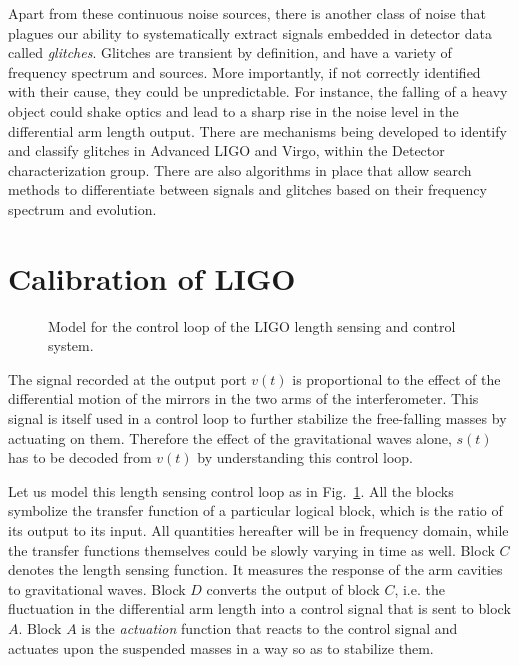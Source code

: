 Apart from these continuous noise sources, there is another class of noise 
that plagues our ability to systematically extract signals embedded in detector
data called {\it glitches}. Glitches are transient by definition, and have a 
variety of frequency spectrum and sources. More importantly, if not correctly 
identified with their cause, they could be unpredictable. For instance, the 
falling of a 
heavy object could shake optics and lead to a sharp rise in the noise level
in the differential arm length output. There are mechanisms being developed to 
identify and classify glitches in Advanced LIGO and Virgo, within the Detector
characterization group. There are also algorithms in place that allow search 
methods to differentiate between signals and glitches based on their frequency
spectrum and evolution.


\section{Calibration of LIGO}\label{sec:ligo_calibration}
\begin{figure}
 \begin{center}
 \end{center}
\label{fig:ligo_calibration}
\caption{Model for the control loop of the LIGO length sensing and control system.}
\end{figure}

The signal recorded at the output port $v(t)$ is proportional to the effect of 
the differential motion of the mirrors in the two arms of the interferometer.
This signal is itself used in a control loop to further stabilize the free-falling
masses by actuating on them. Therefore the effect of the gravitational waves alone, 
$s(t)$ has to be decoded from $v(t)$ by understanding this control loop.

Let us model this length sensing control loop as in
Fig.~\ref{fig:ligo_calibration}. All the blocks symbolize the transfer function
of a particular logical block, which is the ratio of its output to its input.
All quantities hereafter will be in frequency domain, while the transfer 
functions themselves could be slowly varying in time as well. 
Block $C$ denotes the 
length sensing function. It measures the response of the arm cavities to 
gravitational waves. Block $D$ converts the output of block $C$, i.e. the 
fluctuation in the differential arm length into a control signal that is sent
to block $A$. Block $A$ is the {\it actuation} function that reacts to the 
control signal and actuates upon the suspended masses in a way so as to 
stabilize them. 


